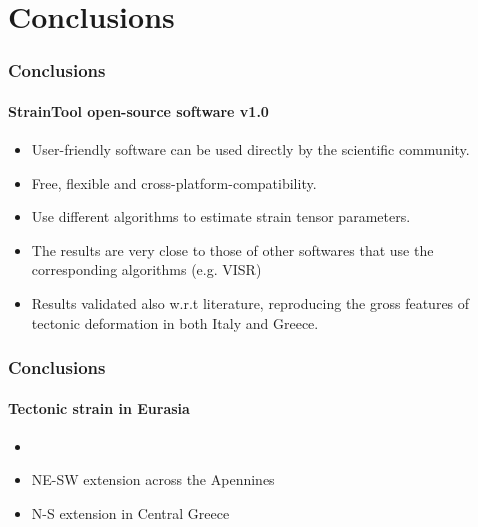 \section{Conclusions}
 

\begin{frame}
 \frametitle{Conclusions}
 \framesubtitle{StrainTool open-source software v1.0}
 \label{ch5:concl}
  
  \begin{itemize}
    \item User-friendly software can be used directly by the scientific community.
    \item Free, flexible and cross-platform-compatibility.
    \item Use different algorithms to estimate strain tensor parameters.
    \item The results are very close to those of other softwares that use the corresponding algorithms (e.g. VISR)
    \item Results validated also w.r.t literature, reproducing the gross features of tectonic deformation in both Italy and Greece.
  \end{itemize}
\end{frame}
\note{}


\begin{frame}
 \frametitle{Conclusions}
 \framesubtitle{Tectonic strain in Eurasia}
 \label{ch5:concl}
  \begin{itemize}
    \item
    \item NE-SW extension across the Apennines
    \item N-S extension in Central Greece
  \end{itemize}

\end{frame}
\note{}


